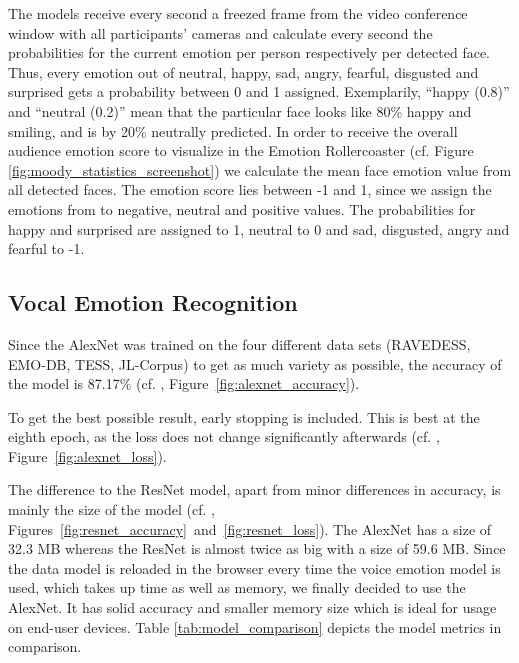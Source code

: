 The models receive every second a freezed frame from the video conference window with all participants' cameras and calculate every second the probabilities for the current  emotion per person respectively per detected face. Thus, every emotion out of neutral, happy, sad, angry, fearful, disgusted and surprised gets a probability between 0 and 1 assigned. Exemplarily, ``happy (0.8)'' and ``neutral (0.2)'' mean that the particular face looks like 80\% happy and smiling, and is by 20\% neutrally predicted. In order to receive the overall audience emotion score to visualize in the Emotion Rollercoaster (cf. Figure \ref{fig:moody_statistics_screenshot}) we calculate the mean face emotion value from all detected faces. The emotion score lies between -1 and 1, since we assign the emotions from  to negative, neutral and positive values. The probabilities for happy and surprised are assigned to 1, neutral to 0 and sad, disgusted, angry and fearful to -1.

\subsection{Vocal Emotion Recognition}
\label{subsec:results_vocal_emotion_recognition}
Since the AlexNet was trained on the four different data sets (RAVEDESS, EMO-DB, TESS, JL-Corpus) to get as much variety as possible, the accuracy of the model is 87.17\% (cf. , Figure~\ref{fig:alexnet_accuracy}). 

To get the best possible result, early stopping is included. This is best at the eighth epoch, as the loss does not change significantly afterwards (cf. , Figure~\ref{fig:alexnet_loss}).

The difference to the ResNet model, apart from minor differences in accuracy, is mainly the size of the model (cf. , Figures~\ref{fig:resnet_accuracy}~and~\ref{fig:resnet_loss}). The AlexNet has a size of 32.3 MB whereas the ResNet is almost twice as big with a size of 59.6 MB. Since the data model is reloaded in the browser every time the voice emotion model is used, which takes up time as well as memory, we finally decided to use the AlexNet. It has solid accuracy and smaller memory size which is ideal for usage on end-user devices. Table \ref{tab:model_comparison} depicts the model metrics in comparison.


